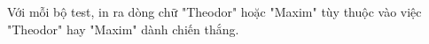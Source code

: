 Với mỗi bộ test, in ra dòng chữ "Theodor" hoặc "Maxim" tùy thuộc vào việc "Theodor" hay "Maxim" dành chiến thắng.